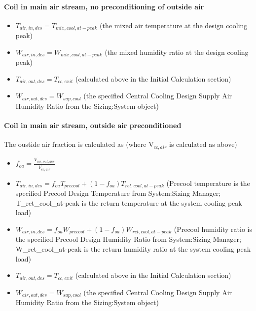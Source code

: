 \paragraph{\textbf{Coil in main air stream, no preconditioning of outside air} }\label{coil-in-main-air-stream-no-preconditioning-of-outside-air}

\begin{itemize}
\item
  \(T_{air,in,des} = T_{mix,cool,at-peak}\) (the mixed air temperature at the design cooling peak)
\item
  \(W_{air,in,des} = W_{mix,cool,at-peak}\) (the mixed humidity ratio at the design cooling peak)
\item
  \(T_{air,out,des} = T_{cc,exit}\) (calculated above in the Initial Calculation section)
\item
  \(W_{air,out,des} = W_{sup,cool}\) (the specified Central Cooling Design Supply Air Humidity Ratio from the Sizing:System object)
\end{itemize}

\paragraph{\textbf{Coil in main air stream, outside air preconditioned} }\label{coil-in-main-air-stream-outside-air-preconditioned}

The oustide air fraction is calculated as (where V\(_{cc,air}\) is calculated as above)

\begin{itemize}
\item
  \(f_{oa} = \frac{\dot V_{air,out,des}}{\dot{V}_{cc,air}}\)
\item
  \(T_{air,in,des} = f_{oa}T_{precool} + \left(1-f_{oa}\right)T_{ret,cool,at-peak}\) (Precool temperature is the specified Precool Design Temperature from System:Sizing Manager; T\_ret\_cool\_at-peak is the return temperature at the system cooling peak load)
\item
  \(W_{air,in,des} = f_{oa}W_{precool} + \left(1-f_{oa}\right)W_{ret,cool,at-peak}\) (Precool humidity ratio is the specified Precool Design Humidity Ratio from System:Sizing Manager; W\_ret\_cool\_at-peak is the return humidity ratio at the system cooling peak load)
\item
  \(T_{air,out,des} = T_{cc,exit}\) (calculated above in the Initial Calculation section)
\item
  \(W_{air,out,des} = W_{sup,cool}\) (the specified Central Cooling Design Supply Air Humidity Ratio from the Sizing:System object)
\end{itemize}

